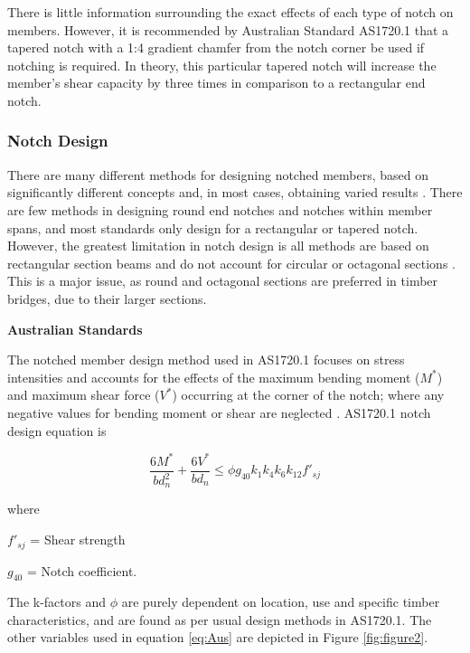 \documentclass[11pt,a4paper]{article}
\numberwithin{equation}{subsection}
\begin{document}
	\noindent
	There is little information surrounding the exact effects of each type of notch on members. However, it is recommended by Australian Standard AS1720.1 that a tapered notch with a 1:4 gradient chamfer from the notch corner be used if notching is required. In theory, this particular tapered notch will increase the member's shear capacity by three times in comparison to a rectangular end notch\cite{_timber_2005}. 
	
	
	\subsubsection{Notch Design}	
	There are many different methods for designing notched members, based on significantly different concepts and, in most cases, obtaining varied results \cite{jockwer_structural_2014}. There are few methods in designing round end notches and notches within member spans, and most standards only design for a rectangular or tapered notch. However, the greatest limitation in notch design is all methods are based on rectangular section beams and do not account for circular or octagonal sections \cite{_timber_2005}. This is a major issue, as round and octagonal sections are preferred in timber bridges, due to their larger sections. 
	
	\vspace*{\baselineskip}
	
	\noindent
	\textbf{Australian Standards}\par
	\noindent
	The notched member design method used in AS1720.1 focuses on stress intensities and accounts for the effects of the maximum bending moment ($M^{*}$) and maximum shear force ($V^{*}$) occurring at the corner of the notch; where any negative values for bending moment or shear are neglected  \cite{jockwer_structural_2014}. AS1720.1 notch design equation is
	
	\begin{equation}
    \dfrac{6M^*}{bd_n^2} + \dfrac{6V^*}{bd_n} \leq \phi g_{40} k_1 k_4 k_6 k_{12} f'_{sj}
    \label{eq:Aus}
	\end{equation}
	
	\noindent
	where \par
	$ f'_{sj} $ = Shear strength\par
	$ g_{40} $ = Notch coefficient.\par
	
	\vspace*{\baselineskip}
	
	\noindent
	The k-factors and $\phi$ are purely dependent on location, use and specific timber characteristics, and are found as per usual design methods in AS1720.1. The other variables used in equation \ref{eq:Aus} are depicted in Figure \ref{fig:figure2}.
	
\end{document}
